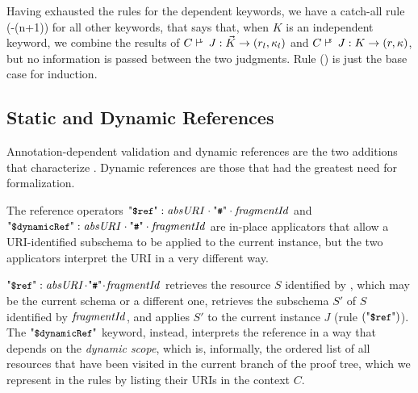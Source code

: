 Having exhausted the rules for the dependent keywords, we have a catch-all rule (\rklist-(n+1)) for all other keywords, that
says that, when $K$ is an independent keyword, we combine the results
of $\KLJudgCJ{\Kl}\Ret{\rl}{(r_l,\pk_l)}$ and $\KJudg{C}{J}{K}\Ret{r}{(r,\pk)}$, but no information
is passed between the two judgments.
Rule () is just the base case for induction.


%



\subsection{Static and Dynamic References}\label{sec:refs}

Annotation-dependent validation and dynamic references are the two additions that characterize {\mJS}.
Dynamic references are those that had the greatest need for formalization.

The reference operators ${\qdref} : {\UU}\lcatHash\key{fragmentId}$ and
${\qddref} : {\UU}\lcatHash\key{fragmentId}$ are in-place applicators that allow a URI-identified subschema to be applied
to the current instance,
but the two applicators interpret the URI in a very different way. %

$\qdref: \key{absURI}\catHash\key{fragmentId}$ retrieves the resource $S$ identified by {\UU},
which may be the current schema or a different one, retrieves the subschema $S'$ of $S$ identified by
$\mathit{fragmentId}$, and applies $S'$ to the current instance $J$ (rule $(\adref)$).
The $\qddref$ keyword, instead, interprets the reference in a way that depends on the 
\emph{dynamic scope}, which is, informally, the ordered list of all resources that have been visited in the current branch of the
proof tree, which we represent in the rules by listing their URIs in the context $C$.

